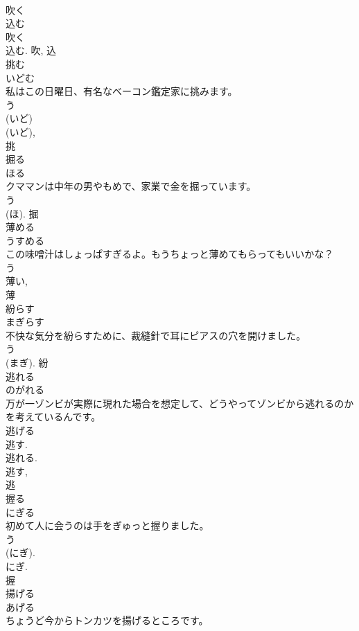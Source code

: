\documentclass[8pt]{extreport}
\begin{document}
\begin{CJK}{UTF8}{min}
\\	吹く 
\\	込む 
\\	吹く 
\\	込む.	吹, 込	
\\	挑む	
\\	いどむ	
\\	私はこの日曜日、有名なベーコン鑑定家に挑みます。	
\\	う 
\\	(いど) 
\\	(いど), 
\\	挑	
\\	掘る	
\\	ほる	
\\	クママンは中年の男やもめで、家業で金を掘っています。	
\\	う 
\\	(ほ).	掘	
\\	薄める	
\\	うすめる	
\\	この味噌汁はしょっぱすぎるよ。もうちょっと薄めてもらってもいいかな？	
\\	う 
\\	薄い, 
\\	薄	
\\	紛らす	
\\	まぎらす	
\\	不快な気分を紛らすために、裁縫針で耳にピアスの穴を開けました。	
\\	う 
\\	(まぎ).	紛	
\\	逃れる	
\\	のがれる	
\\	万が一ゾンビが実際に現れた場合を想定して、どうやってゾンビから逃れるのかを考えているんです。	
\\	逃げる 
\\	逃す. 
\\	逃れる. 
\\	逃す, 
\\	逃	
\\	握る	
\\	にぎる	
\\	初めて人に会うのは手をぎゅっと握りました。	
\\	う 
\\	(にぎ). 
\\	にぎ.
\\	握	
\\	揚げる	
\\	あげる	
\\	ちょうど今からトンカツを揚げるところです。	

\end{CJK}
\end{document}
